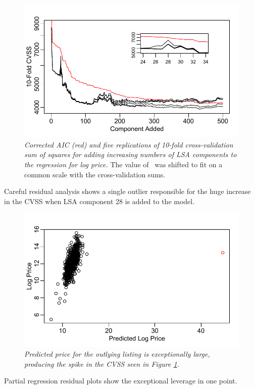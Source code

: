 \documentclass[12pt]{article}
\begin{document}
\begin{figure}
\caption{ \label{fig:cvss} {\sl Corrected AIC (red) and five replications of
 10-fold cross-validation sum of squares for adding increasing numbers of LSA
 components to the regression for log price. }  The value of \aicc\ was shifted
 to fit on a common scale with the cross-validation sums.}
  \centerline{ \includegraphics[width=5in]{figures/cvss.pdf} }
\end{figure}


Careful residual analysis shows a single outlier responsible for the huge
increase in the CVSS when LSA component 28 is added to the model.

\begin{figure}
\caption{ \label{fig:calib} {\sl Predicted price for the outlying listing is
exceptionally large, producing the spike in the CVSS seen in Figure
\ref{fig:cvss}.}}
  \centerline{ \includegraphics[width=5in]{figures/calibrate.pdf} }
\end{figure}


Partial regression residual plots show the exceptional leverage in one point.
\end{document}
